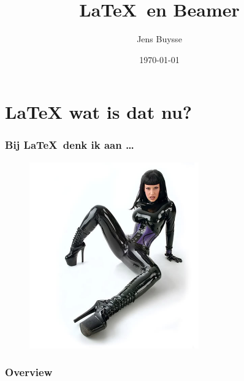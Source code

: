 \documentclass{beamer}
\title[\LaTeX\ en Beamer]{\LaTeX\ en Beamer} %
\author{Jens Buysse} %
\institute[HoGent] %
{
Hogeschool Gent \\ %
\medskip
\textit{jens.buysse@hogent.be} %
}
\date{\today} %
\begin{document}
\begin{frame}
\titlepage %
\end{frame}




\section{\LaTeX{} wat is dat nu?}

\begin{frame}
	\frametitle{Bij \LaTeX\ denk ik aan \dots}
	
	\begin{figure}
		\centering
			\includegraphics[width=0.65\textwidth]{images/latex.jpg}
		\label{fig:latex}
	\end{figure}
	
\end{frame}

\begin{frame}
\frametitle{Overview} %
\tableofcontents %
\end{frame}
\end{document}
